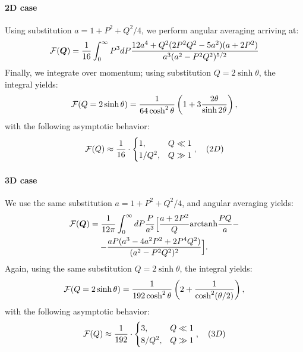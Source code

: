 \documentclass[twocolumn,english,prb]{revtex4-1}
\begin{document}
\paragraph{2D case}
Using substitution $a = 1 + P^2 + Q^2/4$, we perform angular averaging arriving at:
\begin{equation}
{\cal F}(\boldsymbol{Q}) = \frac{1}{16}\int_{0}^{\infty}P^{3}dP\frac{12a^{4}+Q^{2}(2P^{2}Q^{2}-5a^{2})(a+2P^{2})}{a^{3}(a^{2}-P^{2}Q^{2})^{5/2}}
\end{equation} 
Finally, we integrate over momentum; using substitution $Q = 2 \sinh \theta$, the integral yields:
\begin{equation}
{\cal F}(Q=2\sinh\theta)=\frac{1}{64\cosh^{2}\theta}\left(1+3\frac{2\theta}{\sinh2\theta}\right),
\end{equation}
with the following asymptotic behavior:
\begin{equation}
\label{eq:AsymptoticF2D}
{\cal F}(Q) \approx \frac{1}{16}\cdot\begin{cases}
1, & Q\ll 1\\
1/Q^2, & Q\gg1
\end{cases},\quad (2D)
\end{equation}
\paragraph{3D case}
We use the same substitution $a = 1 + P^2 + Q^2/4$, and angular averaging yields:
\begin{multline}
{\cal F}(\boldsymbol{Q}) = \frac{1}{12\pi}\int_{0}^{\infty}dP\frac{P}{a^{3}}\Big[\frac{a+2P^{2}}{Q}{\rm arctanh}\frac{PQ}{a}-\\
-\frac{aP(a^{3}-4a^{2}P^{2}+2P^{4}Q^{2})}{(a^{2}-P^{2}Q^{2})^{2}}\Big].
\end{multline}
Again, using the same substitution $Q = 2 \sinh \theta$, the integral yields:
\begin{equation}
{\cal F}(Q=2\sinh\theta)=\frac{1}{192\cosh^{2}\theta}\left(2+\frac{1}{\cosh^{2}(\theta/2)}\right),
\end{equation}
with the following asymptotic behavior:
\begin{equation}
\label{eq:AsymptoticF3D}
{\cal F}(Q) \approx \frac{1}{192}\cdot\begin{cases}
3, & Q\ll1\\
8 / Q^2, & Q\gg1
\end{cases},\quad (3D)
\end{equation}
\end{document}
